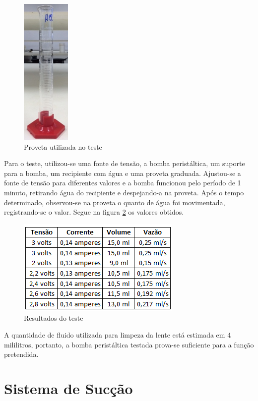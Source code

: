 \begin{figure}[H]
		\centering
			\includegraphics[scale=1.0]{figuras/proveta.png}
		\caption{Proveta utilizada no teste}
		\label{proveta}
\end{figure}


Para o teste, utilizou-se uma fonte de tensão, a bomba peristáltica, um suporte para a bomba, um recipiente com água e uma proveta graduada. Ajustou-se a fonte de tensão para diferentes valores e a bomba funcionou pelo período de 1 minuto, retirando água do recipiente e despejando-a na proveta. Após o tempo determinado, observou-se na proveta o quanto de água foi movimentada, registrando-se o valor. Segue na figura \ref{resultadosbomba} os valores obtidos.

\begin{figure}[H]
		\centering
			\includegraphics[scale=1.0]{figuras/resultadosbomba.png}
		\caption{Resultados do teste}
		\label{resultadosbomba}
\end{figure}


A quantidade de fluido utilizada para limpeza da lente está estimada em 4 mililitros, portanto, a bomba peristáltica testada prova-se suficiente para a função pretendida.






\section[Sistema de Sucção]{Sistema de Sucção}


